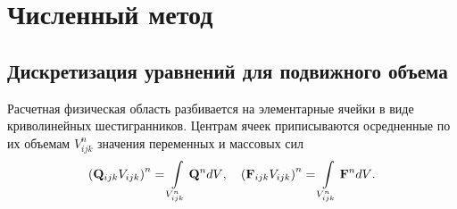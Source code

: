 \section{Численный метод}
\label{s:12}
\subsection{Дискретизация уравнений для подвижного объема}
\label{s:121}
Расчетная физическая область разбивается на элементарные ячейки в виде криволинейных 
шестигранников. Центрам ячеек приписываются осредненные по их объемам $V^n_{ijk}$ значения переменных и
массовых сил
\begin{equation}
  \label{13} 
  \left( {{\bf{Q}}_{ijk} V_{ijk} } \right)^n  = \int\limits_{V_{ijk}^n } {{\bf{Q}}^n dV} ,\quad   \left(
  {{\bf{F}}_{ijk} V_{ijk} } \right)^n  = \int\limits_{V_{ijk}^n }
  {{\bf{F}}^n dV}.
\end{equation}

